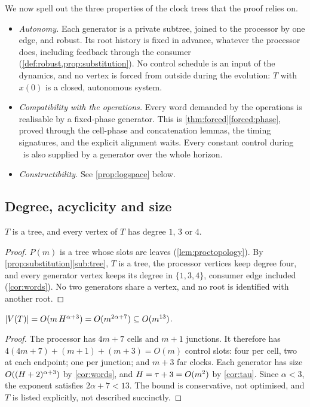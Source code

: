 We now spell out the three properties of the clock trees that the proof relies on.
\begin{itemize}
\item \emph{Autonomy.} Each generator is a private subtree, joined to the processor by one edge, and
  robust. Its root history is fixed in advance, whatever the processor does, including feedback
  through the consumer (\cref{def:robust,prop:substitution}). No control schedule is an input of the
  dynamics, and no vertex is forced from outside during the evolution: $T$ with $x(0)$ is a closed,
  autonomous system.
\item \emph{Compatibility with the operations.} Every word demanded by the operations is realisable
  by a fixed-phase generator. This is \cref{thm:forced}\ref{forced:phase}, proved through the
  cell-phase and concatenation lemmas, the timing signatures, and the explicit alignment waits.
  Every constant control during \HOLD\ is also supplied by a generator over the whole horizon.
\item \emph{Constructibility.} See \cref{prop:logspace} below.
\end{itemize}

\subsection{Degree, acyclicity and size}

\begin{proposition}[Topology]\label{prop:topology}
$T$ is a tree, and every vertex of $T$ has degree $1$, $3$ or $4$.
\end{proposition}

\begin{proof}
$P(m)$ is a tree whose slots are leaves (\cref{lem:proctopology}). By
\cref{prop:substitution}\ref{sub:tree}, $T$ is a tree, the processor vertices keep degree four, and
every generator vertex keeps its degree in $\{1,3,4\}$, consumer edge included (\cref{cor:words}).
No two generators share a vertex, and no root is identified with another root.
\end{proof}

\begin{proposition}[Size]\label{prop:size}
$|V(T)|=O(m\,H^{\alpha+3})=O(m^{2\alpha+7})\subseteq O(m^{13})$.
\end{proposition}

\begin{proof}
The processor has $4m+7$ cells and $m+1$ junctions. It therefore has $4(4m+7)+(m+1)+(m+3)=O(m)$
control slots: four per cell, two at each endpoint; one per junction; and $m+3$ far clocks. Each
generator has size $O((H+2)^{\alpha+3})$ by \cref{cor:words}, and $H=\tau+3=O(m^2)$ by
\cref{cor:tau}. Since $\alpha<3$, the exponent satisfies $2\alpha+7<13$. The bound is conservative,
not optimised, and $T$ is listed explicitly, not described succinctly.
\end{proof}

